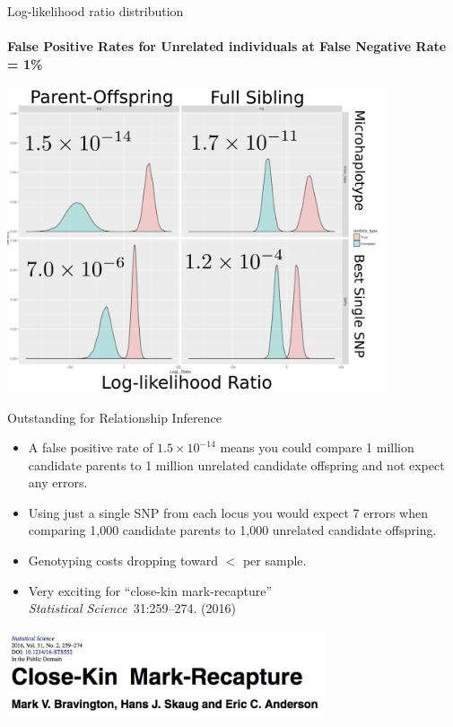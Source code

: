 \documentclass[letter,graphicx]{beamer}
\begin{document}
\begin{frame}{Log-likelihood ratio distribution}
\framesubtitle{False Positive Rates for Unrelated individuals at False Negative Rate = 1\%}
\begin{center}
\includegraphics[width = 0.84\textwidth]{mhap_figs/loglrats-FPR.pdf}
\end{center}

\end{frame}












\begin{frame}{Outstanding for Relationship Inference}
\begin{itemize}
\item A false positive rate of $1.5 \times 10^{-14}$ means you could compare 1 million candidate parents to 1 million unrelated candidate offspring and not expect any errors.
\item Using just a single SNP from each locus you would expect 7 errors when comparing 1,000 candidate parents to 1,000 unrelated candidate offspring.
\item Genotyping costs dropping toward $<$ per sample.
\item Very exciting for ``close-kin mark-recapture''\\
{\em Statistical Science}~31:259--274. (2016)
\end{itemize}
\begin{center}
\includegraphics[width = 0.7\textwidth]{mhap_figs/ckmr-header.png}
\end{center}
\end{frame}
\end{document}
